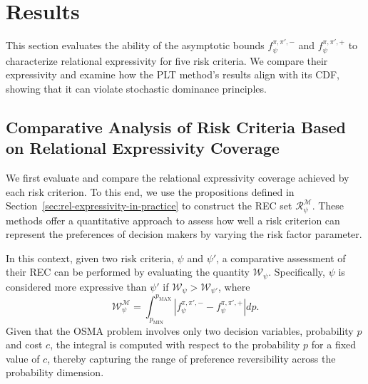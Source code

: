 \documentclass[runningheads]{llncs}
\begin{document}
\section{Results}\label{sec:results}


This section evaluates the ability of the asymptotic bounds $f^{\pi, \pi', -}_{\psi}$ and $f^{\pi, \pi', +}_{\psi}$ to characterize relational expressivity for five risk criteria. We compare their expressivity and examine how the PLT method's results align with its CDF, showing that it can violate stochastic dominance principles.

\subsection{Comparative Analysis of Risk Criteria Based on Relational Expressivity Coverage}
\label{subsec:comparison_expressivity}

We first evaluate and compare the relational expressivity coverage achieved by each risk criterion. To this end, we use the propositions defined in Section~\ref{sec:rel-expressivity-in-practice} to construct the REC set $\mathcal{R}^{\mathcal{M}}_\psi$. These methods offer a quantitative approach to assess how well a risk criterion can represent the preferences of decision makers by varying the risk factor parameter.

In this context, given two risk criteria, $\psi$ and $\psi'$, a comparative assessment of their REC can be performed by evaluating the quantity $\mathcal{W}_{\psi}$. Specifically, $\psi$ is considered more expressive than $\psi'$ if $\mathcal{W}_{\psi} > \mathcal{W}_{\psi'}$, where
\begin{equation}
    \mathcal{W}^{\mathcal{M}}_{\psi} = \int_{p_{\mathrm{MIN}}}^{p_{\mathrm{MAX}}} \left| f^{\pi, \pi', -}_{\psi} - f^{\pi, \pi', +}_{\psi} \right| dp.
\end{equation}
Given that the OSMA problem involves only two decision variables, probability $p$ and cost $c$, the integral is computed with respect to the probability $p$ for a fixed value of $c$, thereby capturing the range of preference reversibility across the probability dimension.
\end{document}
